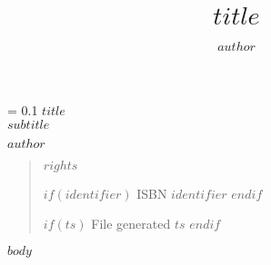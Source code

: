 \documentclass[10pt,twoside,openright]{book}
\title{$title$}
\author{$author$}
\newcommand*{\titleBook}{\begingroup
\thispagestyle{empty}
\newlength{\drop}
\drop = 0.1\textheight
\parindent=0pt
\vspace*{\drop}
{\Huge\bfseries $title$}\\[\baselineskip]
{\Large $subtitle$}\par
\vfill
{\Large {\scshape $author$}}
\vspace*{\drop}
\endgroup}
\begin{document}
\frontmatter
\titleBook

\newpage
\vspace*{7em}
\begin{quote}
\begin{small}
$rights$

$if(identifier)$
ISBN $identifier$
$endif$

$if(ts)$
File generated $ts$
$endif$
\end{small}
\end{quote}
\newpage

\setcounter{tocdepth}{0}
\tableofcontents

\mainmatter

$body$

\backmatter


\end{document}
